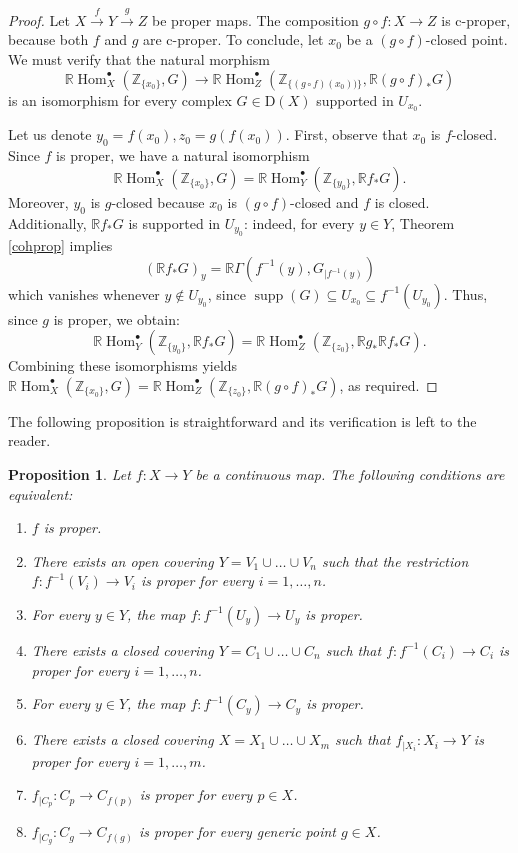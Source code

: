 \documentclass[amssymb,amscd,11pt,20pt]{amsart}
\newcommand{\ZZ}{{\mathbb Z}}
\newcommand{\RR}{\mathbb R}
\newcommand{\0}{\mathbf 0}
\DeclareMathOperator{\Hom}{{Hom}}
\newcommand{\pun}{{\scriptscriptstyle \bullet}}
\newcommand{\supp}{\operatorname{supp}}
\theoremstyle{plain}
\newtheorem{prop}[thm]{Proposition}
\numberwithin{equation}{thm}
\begin{document}
\begin{proof} Let $X\overset f\to Y\overset g\to Z$ be proper maps. The composition $g\circ f\colon X\to Z$ is c-proper, because both $f$ and $g$ are c-proper. To conclude, let $x_0$ be a  $(g\circ f)$-closed point. We must verify that the natural morphism
  \[ \RR\Hom_X^\pun(\ZZ_{\{x_0\}}, G)\to\RR\Hom_Z^\pun (\ZZ_{\{(g\circ f)(x_0))\}},\RR (g\circ f)_*G)\] is an isomorphism for every complex $G\in \mathrm{D}(X)$ supported in $U_{x_0}$.

Let us denote $y_0=f(x_0), z_0=g(f(x_0))$.  First, observe  that $x_0$ is $f$-closed. Since $f$ is proper, we have a natural isomorphism  $$ \RR\Hom_X^\pun(\ZZ_{\{x_0\}}, G)= \RR\Hom_Y^\pun(\ZZ_{\{y_0\}}, \RR f_*G).$$  Moreover,
 $y_0$ is $g$-closed  because $x_0$ is $(g\circ f)$-closed  and $f$ is closed. Additionally,  $\RR f_*G$ is supported in $U_{y_0}$: indeed, for every $y\in Y$, Theorem \ref{cohprop} implies
\[ (\RR f_* G)_y = \RR\Gamma (f^{-1}(y),G_{\vert f^{-1}(y)})\] which vanishes whenever $y\notin U_{y_0}$, since  $\supp (G)\subseteq U_{x_0}\subseteq f^{-1}(U_{y_0})$.
Thus,  since $g$ is proper, we obtain: 
\[ \RR\Hom_Y^\pun(\ZZ_{\{y_0\}}, \RR f_*G)=\RR\Hom_Z^\pun (\ZZ_{\{z_0\}},\RR g_* \RR f_*G).\] Combining these isomorphisms yields   $ \RR\Hom_X^\pun(\ZZ_{\{x_0\}}, G)=\RR\Hom_Z^\pun (\ZZ_{\{z_0\}},\RR (g\circ f)_*G)$, as required.

\end{proof}

The following proposition is straightforward  and its verification  is left to the reader.

\begin{prop} Let $f\colon X\to Y$ be a continuous map. The following conditions are equivalent:
\begin{enumerate} 
\item $f$ is proper.
\item There exists an open covering $Y=V_1\cup\dots\cup V_n$ such that the restriction $f\colon f^{-1}(V_i)\to V_i$ is proper for every $i=1,\dots,n$.
\item For every $y\in Y$, the map $f\colon f^{-1}(U_y)\to U_y$ is proper.
\item There exists a closed covering $Y=C_1\cup\dots\cup C_n$ such that $f\colon f^{-1}(C_i)\to C_i$ is proper for every $i=1,\dots,n$.
\item For every $y\in Y$, the map $f\colon f^{-1}(C_y)\to C_y$ is proper.
\item There exists a closed covering $X=X_1\cup\dots \cup X_m$ such that $f_{\vert X_i}\colon X_i\to Y$ is proper for every $i=1,\dots ,m$.
\item $f_{\vert C_p}\colon C_p\to C_{f(p)}$ is proper for every $p\in X$.
\item $f_{\vert C_g}\colon C_g\to C_{f(g)}$ is proper for every generic point $g\in X$.
\end{enumerate}
\end{prop}
\end{document}
